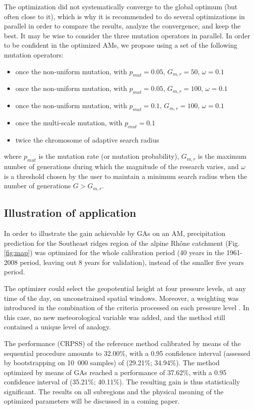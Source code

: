 \documentclass{ametsoc}
\begin{document}
The optimization did not systematically converge to the global optimum (but often close to it), which is why it is recommended to do several optimizations in parallel in order to compare the results, analyze the convergence, and keep the best. It may be wise to consider the three mutation operators in parallel. In order to be confident in the optimized AMs, we propose using a set of the following mutation operators:

\begin{itemize}
	\setlength\itemsep{-4px}
	\item once the non-uniform mutation, with $p_{mut}=0.05$, $G_{m,r}=50$, $\omega=0.1$
	\item once the non-uniform mutation, with $p_{mut}=0.05$, $G_{m,r}=100$, $\omega=0.1$
	\item once the non-uniform mutation, with $p_{mut}=0.1$, $G_{m,r}=100$, $\omega=0.1$
	\item once the multi-scale mutation, with  $p_{mut}=0.1$
	\item twice the chromosome of adaptive search radius
\end{itemize}

where $p_{mut}$ is the mutation rate (or mutation probability), $G_{m,r}$ is the maximum number of generations during which the magnitude of the research varies, and $\omega$ is a threshold chosen by the user to maintain a minimum search radius when the number of generations $G>G_{m,r}$.


\subsection{Illustration of application}

In order to illustrate the gain achievable by GAs on an AM, precipitation prediction for the Southeast ridges region of the alpine Rh\^{o}ne catchment (Fig. \ref{fig:map}) was optimized for the whole calibration period (40 years in the 1961-2008 period, leaving out 8 years for validation), instead of the smaller five years period.

The optimizer could select the geopotential height at four pressure levels, at any time of the day, on unconstrained spatial windows. Moreover, a weighting was introduced in the combination of the criteria processed on each pressure level \citep[such as][]{Horton2012a, Junk2015}. In this case, no new meteorological variable was added, and the method still contained a unique level of analogy.

The performance (CRPSS) of the reference method calibrated by means of the sequential procedure amounts to 32.00\%, with a 0.95 confidence interval (assessed by bootstrapping on 10~000 samples) of (29.21\%; 34.94\%). The method optimized by means of GAs reached a performance of 37.62\%, with a 0.95 confidence interval of (35.21\%; 40.11\%). The resulting gain is thus statistically significant. The results on all subregions and the physical meaning of the optimized parameters will be discussed in a coming paper.
\end{document}
